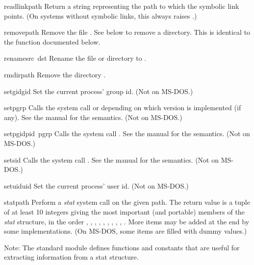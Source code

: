 \begin{funcdesc}{readlink}{path}
Return a string representing the path to which the symbolic link
points.  (On systems without symbolic links, this always raises
.)
\end{funcdesc}

\begin{funcdesc}{remove}{path}
Remove the file .  See  below to remove a directory.
This is identical to the  function documented below.
\end{funcdesc}

\begin{funcdesc}{rename}{src\, dst}
Rename the file or directory  to .
\end{funcdesc}

\begin{funcdesc}{rmdir}{path}
Remove the directory .
\end{funcdesc}

\begin{funcdesc}{setgid}{gid}
Set the current process' group id.
(Not on MS-DOS.)
\end{funcdesc}

\begin{funcdesc}{setpgrp}{}
Calls the system call  or 
depending on which version is implemented (if any).  See the \UNIX{}
manual for the semantics.
(Not on MS-DOS.)
\end{funcdesc}

\begin{funcdesc}{setpgid}{pid\, pgrp}
Calls the system call .  See the \UNIX{} manual for
the semantics.
(Not on MS-DOS.)
\end{funcdesc}

\begin{funcdesc}{setsid}{}
Calls the system call .  See the \UNIX{} manual for the
semantics.
(Not on MS-DOS.)
\end{funcdesc}

\begin{funcdesc}{setuid}{uid}
Set the current process' user id.
(Not on MS-DOS.)
\end{funcdesc}

\begin{funcdesc}{stat}{path}
Perform a \emph{stat} system call on the given path.  The return value
is a tuple of at least 10 integers giving the most important (and
portable) members of the \emph{stat} structure, in the order
,
,
,
,
,
,
,
,
,
.
More items may be added at the end by some implementations.
(On MS-DOS, some items are filled with dummy values.)

Note: The standard module  defines functions and constants
that are useful for extracting information from a stat structure.
\end{funcdesc}

